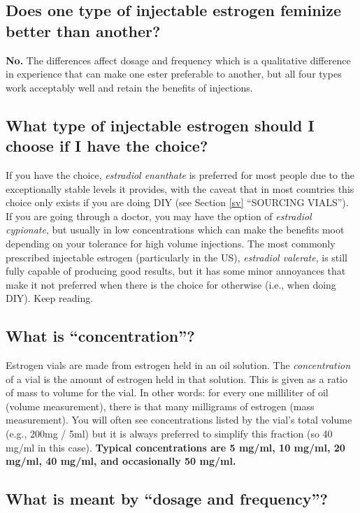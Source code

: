 \documentclass{article}
\begin{document}
\subsection{Does one type of injectable estrogen feminize better than another?}

\textbf{No.} The differences affect dosage and frequency which is a qualitative difference in experience that can make one ester preferable to another, but all four types work acceptably well and retain the benefits of injections. 

\subsection{What type of injectable estrogen should I choose if I have the choice?}

If you have the choice, \textit{estradiol enanthate} is preferred for most people due to the exceptionally stable levels it provides, with the caveat that in most countries this choice only exists if you are doing DIY (see Section \ref{sv} “SOURCING VIALS”). If you are going through a doctor, you may have the option of \textit{estradiol cypionate}, but usually in low concentrations which can make the benefits moot depending on your tolerance for high volume injections. The most commonly prescribed injectable estrogen (particularly in the US), \textit{estradiol valerate}, is still fully capable of producing good results, but it has some minor annoyances that make it not preferred when there is the choice for otherwise (i.e., when doing DIY). Keep reading.

\subsection{What is “concentration”?}

Estrogen vials are made from estrogen held in an oil solution. The \textit{concentration} of a vial is the amount of estrogen held in that solution. This is given as a ratio of mass to volume for the vial. In other words: for every one milliliter of oil (volume measurement), there is that many milligrams of estrogen (mass measurement). You will often see concentrations listed by the vial’s total volume (e.g., 200mg / 5ml) but it is always preferred to simplify this fraction (so 40 mg/ml in this case). \textbf{Typical concentrations are 5 mg/ml, 10 mg/ml, 20 mg/ml, 40 mg/ml, and occasionally 50 mg/ml.}

\subsection{What is meant by “dosage and frequency”?}
\end{document}
